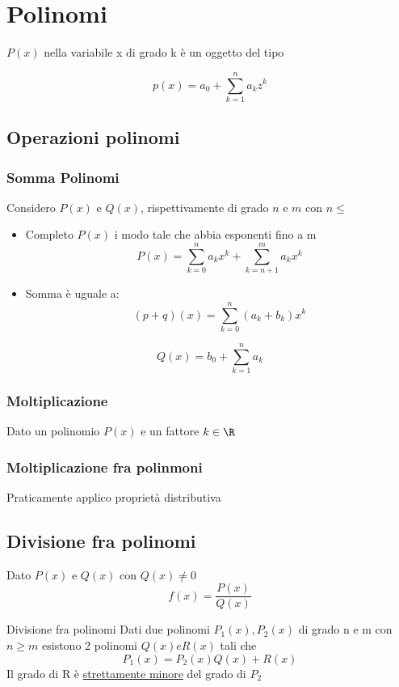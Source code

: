 \section{Polinomi}
\label{cha:polinomi}
$ P\left( x \right)$  nella variabile x di grado k è un oggetto del tipo

\[
	p\left( x \right) = a_0 + \sum_{k=1}^{n} a_k z^k
\]


\subsection{Operazioni polinomi}
\label{sec:operazionipolinomi}
\subsubsection{Somma Polinomi}
Considero $P\left( x \right) $ e $Q\left( x \right) $, rispettivamente di grado $n$ e $m$ con $n \le $
\begin{itemize}
	\item Completo $P\left( x \right) $ i modo tale che abbia esponenti fino a m
	      \[
		      P\left( x \right) = \sum_{k=0}^{n} a_k x^{k} + \sum_{k=n+1}^{m} a_k x^{k}
	      \]
	\item Somma è uguale a:
	      \[
		      \left( p+q \right) \left( x \right) = \sum_{k=0}^{n} \left( a_k + b_k \right)  x^k
	      \]
\end{itemize}
\[
	Q\left( x \right) = b_0 + \sum_{k=1}^{n} a_k
\]

\subsubsection{Moltiplicazione}
\label{sub:moltiplicazione}
Dato un polinomio $P\left( x \right)$ e un fattore $k \in  \R$

\subsubsection{Moltiplicazione fra polinmoni}
\label{sub:moltiplicazionefrapolinmoni}
Praticamente applico proprietà distributiva

\subsection{Divisione fra polinomi}
\label{sub:divisionefrapolinomi}
Dato $P\left( x \right) $ e $ Q\left( x \right) $ con $Q\left( x \right) \neq 0$
\[
	f\left( x \right) = \frac{P\left( x \right) }{Q\left( x \right) }
\]
\begin{teorema}{Divisione fra polinomi}
	Dati due polinomi $ P_1\left( x \right) , P_2\left( x \right)  $ di grado n e m con $n \ge m$ esistono 2 polinomi $ Q\left( x \right)  e R\left( x \right) $ tali che \[
		P_1\left( x \right)  = P_2\left( x \right) Q\left( x \right) + R\left( x \right)
	\]
	Il grado di R è \underline{strettamente minore} del grado di $P_2$

\end{teorema}

